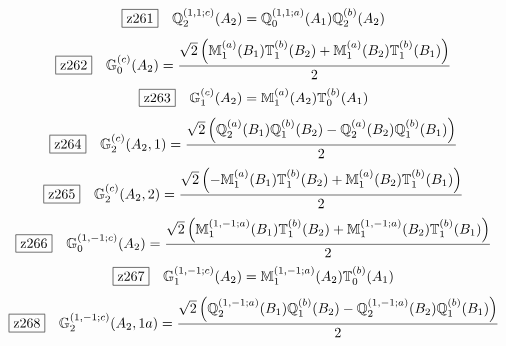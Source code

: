 \documentclass[fleqn,10pt,landscape]{jsarticle}
\begin{document}
\begin{dmath*}
\hspace*{3mm}\fbox{z261}\quad \mathbb{Q}_{2}^{(1,1;c)}(A_{2})=\mathbb{Q}_{0}^{(1,1;a)}(A_{1}) \mathbb{Q}_{2}^{(b)}(A_{2})
\end{dmath*}
\begin{dmath*}
\hspace*{3mm}\fbox{z262}\quad \mathbb{G}_{0}^{(c)}(A_{2})=\frac{\sqrt{2} \left(\mathbb{M}_{1}^{(a)}(B_{1}) \mathbb{T}_{1}^{(b)}(B_{2}) + \mathbb{M}_{1}^{(a)}(B_{2}) \mathbb{T}_{1}^{(b)}(B_{1})\right)}{2}
\end{dmath*}
\begin{dmath*}
\hspace*{3mm}\fbox{z263}\quad \mathbb{G}_{1}^{(c)}(A_{2})=\mathbb{M}_{1}^{(a)}(A_{2}) \mathbb{T}_{0}^{(b)}(A_{1})
\end{dmath*}
\begin{dmath*}
\hspace*{3mm}\fbox{z264}\quad \mathbb{G}_{2}^{(c)}(A_{2},1)=\frac{\sqrt{2} \left(\mathbb{Q}_{2}^{(a)}(B_{1}) \mathbb{Q}_{1}^{(b)}(B_{2}) - \mathbb{Q}_{2}^{(a)}(B_{2}) \mathbb{Q}_{1}^{(b)}(B_{1})\right)}{2}
\end{dmath*}
\begin{dmath*}
\hspace*{3mm}\fbox{z265}\quad \mathbb{G}_{2}^{(c)}(A_{2},2)=\frac{\sqrt{2} \left(- \mathbb{M}_{1}^{(a)}(B_{1}) \mathbb{T}_{1}^{(b)}(B_{2}) + \mathbb{M}_{1}^{(a)}(B_{2}) \mathbb{T}_{1}^{(b)}(B_{1})\right)}{2}
\end{dmath*}
\begin{dmath*}
\hspace*{3mm}\fbox{z266}\quad \mathbb{G}_{0}^{(1,-1;c)}(A_{2})=\frac{\sqrt{2} \left(\mathbb{M}_{1}^{(1,-1;a)}(B_{1}) \mathbb{T}_{1}^{(b)}(B_{2}) + \mathbb{M}_{1}^{(1,-1;a)}(B_{2}) \mathbb{T}_{1}^{(b)}(B_{1})\right)}{2}
\end{dmath*}
\begin{dmath*}
\hspace*{3mm}\fbox{z267}\quad \mathbb{G}_{1}^{(1,-1;c)}(A_{2})=\mathbb{M}_{1}^{(1,-1;a)}(A_{2}) \mathbb{T}_{0}^{(b)}(A_{1})
\end{dmath*}
\begin{dmath*}
\hspace*{3mm}\fbox{z268}\quad \mathbb{G}_{2}^{(1,-1;c)}(A_{2},1a)=\frac{\sqrt{2} \left(\mathbb{Q}_{2}^{(1,-1;a)}(B_{1}) \mathbb{Q}_{1}^{(b)}(B_{2}) - \mathbb{Q}_{2}^{(1,-1;a)}(B_{2}) \mathbb{Q}_{1}^{(b)}(B_{1})\right)}{2}
\end{dmath*}
\end{document}
